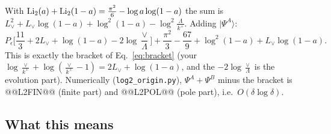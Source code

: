 \documentclass[10pt]{article}
\numberwithin{equation}{section}
\newcommand{\Lv}{L_{\vee}}
\begin{document}
With ${\rm Li}_2(a)+{\rm Li}_2(1-a)=\frac{\pi^2}{6}-\log a\log(1-a)$ the sum is $\Lv^2+\Lv\log(1-a)+\log^2(1-a)-\log^2\frac{\Lambda}{k^+}$. Adding $|\Psi^A\rangle$:
\begin{equation}
P_\epsilon\Big[\frac{11}{3}+2\Lv+\log(1-a)-2\log\frac{\vee}{\Lambda}\Big]+\frac{\pi^2}{3}-\frac{67}{9}+\log^2(1-a)+\Lv\log(1-a).
\end{equation}
This is exactly the bracket of Eq.~\eqref{eq:bracket} (your $\log\frac{\vee}{k^+}+\log(\frac{\vee}{k^+}-1)=2\Lv+\log(1-a)$, and the $-2\log\frac\vee\Lambda$ is the evolution part). Numerically (\texttt{log2\_origin.py}), $\Psi^A+\Psi^B$ minus the bracket is @@L2FIN@@ (finite part) and @@L2POL@@ (pole part), i.e.\ $O(\delta\log\delta)$.

\subsection{What this means}
\end{document}
